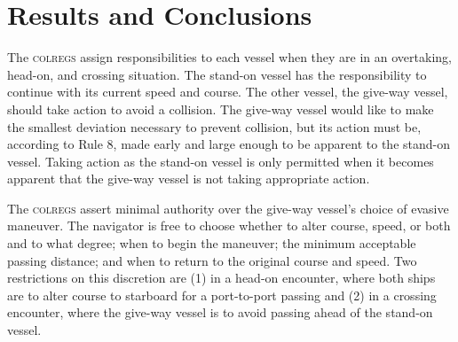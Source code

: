 \documentclass[twoside,symmetric,notoc]{tufte-book}
\begin{document}
\chapter{Results and Conclusions}
\par{%
The \textsc{colregs} assign responsibilities to each vessel when they are in an overtaking, head-on, and crossing situation. The stand-on vessel has the responsibility to continue with its current speed and course. The other vessel, the give-way vessel, should take action to avoid a collision. The give-way vessel would like to make the smallest deviation necessary to prevent collision, but its action must be, according to Rule 8, made early and large enough to be apparent to the stand-on vessel.\cite{USCG} Taking action as the stand-on vessel is only permitted when it becomes apparent that the give-way vessel is not taking appropriate action.
}
\par{%
The \textsc{colregs} assert minimal authority over the give-way vessel's choice of evasive maneuver. The navigator is free to choose whether to alter course, speed, or both and to what degree; when to begin the maneuver; the minimum acceptable passing distance; and when to return to the original course and speed. Two restrictions on this discretion are (1) in a head-on encounter, where both ships are to alter course to starboard for a port-to-port passing and (2) in a crossing encounter, where the give-way vessel is to avoid passing ahead of the stand-on vessel.\cite{Plant}
}
\end{document}

